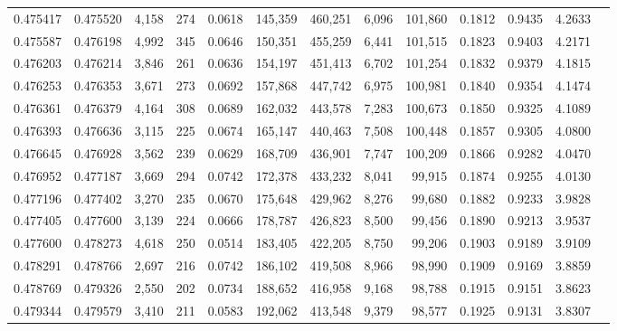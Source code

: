 \begin{tabular}{rrrrrrrrrrrrr}
0.475417 & 0.475520 &  4,158 &   274 &                                     0.0618 & 145,359 & 460,251 &   6,096 & 101,860 & 0.1812 & 0.9435 & 4.2633 \\
0.475587 & 0.476198 &  4,992 &   345 &                                     0.0646 & 150,351 & 455,259 &   6,441 & 101,515 & 0.1823 & 0.9403 & 4.2171 \\
0.476203 & 0.476214 &  3,846 &   261 &                                     0.0636 & 154,197 & 451,413 &   6,702 & 101,254 & 0.1832 & 0.9379 & 4.1815 \\
0.476253 & 0.476353 &  3,671 &   273 &                                     0.0692 & 157,868 & 447,742 &   6,975 & 100,981 & 0.1840 & 0.9354 & 4.1474 \\
0.476361 & 0.476379 &  4,164 &   308 &                                     0.0689 & 162,032 & 443,578 &   7,283 & 100,673 & 0.1850 & 0.9325 & 4.1089 \\
0.476393 & 0.476636 &  3,115 &   225 &                                     0.0674 & 165,147 & 440,463 &   7,508 & 100,448 & 0.1857 & 0.9305 & 4.0800 \\
0.476645 & 0.476928 &  3,562 &   239 &                                     0.0629 & 168,709 & 436,901 &   7,747 & 100,209 & 0.1866 & 0.9282 & 4.0470 \\
0.476952 & 0.477187 &  3,669 &   294 &                                     0.0742 & 172,378 & 433,232 &   8,041 &  99,915 & 0.1874 & 0.9255 & 4.0130 \\
0.477196 & 0.477402 &  3,270 &   235 &                                     0.0670 & 175,648 & 429,962 &   8,276 &  99,680 & 0.1882 & 0.9233 & 3.9828 \\
0.477405 & 0.477600 &  3,139 &   224 &                                     0.0666 & 178,787 & 426,823 &   8,500 &  99,456 & 0.1890 & 0.9213 & 3.9537 \\
0.477600 & 0.478273 &  4,618 &   250 &                                     0.0514 & 183,405 & 422,205 &   8,750 &  99,206 & 0.1903 & 0.9189 & 3.9109 \\
0.478291 & 0.478766 &  2,697 &   216 &                                     0.0742 & 186,102 & 419,508 &   8,966 &  98,990 & 0.1909 & 0.9169 & 3.8859 \\
0.478769 & 0.479326 &  2,550 &   202 &                                     0.0734 & 188,652 & 416,958 &   9,168 &  98,788 & 0.1915 & 0.9151 & 3.8623 \\
0.479344 & 0.479579 &  3,410 &   211 &                                     0.0583 & 192,062 & 413,548 &   9,379 &  98,577 & 0.1925 & 0.9131 & 3.8307 \\

\end{tabular}
